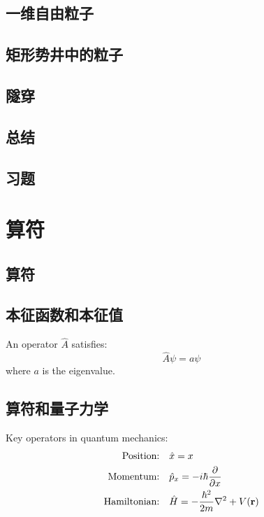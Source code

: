 \documentclass{book}
\begin{document}
	
	\section{一维自由粒子}
	
	\section{矩形势井中的粒子}
	
	\section{隧穿}
	
	\section*{总结}
	
	\section*{习题}
	
	
	
	
	
	\chapter{算符}
	\section{算符}
	
	\section{本征函数和本征值}
	An operator $\hat{A}$ satisfies:
	\begin{equation}
		\hat{A} \psi = a \psi
	\end{equation}
	where $a$ is the eigenvalue.
	
	\section{算符和量子力学}
	Key operators in quantum mechanics:
	\begin{align}
		\text{Position:} & \quad \hat{x} = x \\
		\text{Momentum:} & \quad \hat{p}_x = -i\hbar \pdv{x} \\
		\text{Hamiltonian:} & \quad \hat{H} = -\frac{\hbar^2}{2m} \nabla^2 + V(\mathbf{r})
	\end{align}
	
\end{document}
